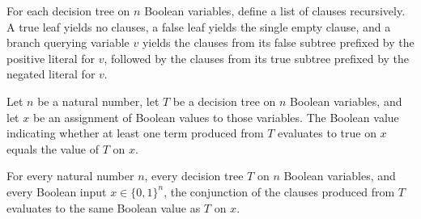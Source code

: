 \begin{definition}
\label{SwitchingLemma.toClauses}
\leanok
{}
For each decision tree on $n$ Boolean variables, define a list of clauses recursively. A
true leaf yields no clauses, a false leaf yields the single empty clause, and a branch
querying variable $v$ yields the clauses from its false subtree prefixed by the positive
literal for $v$, followed by the clauses from its true subtree prefixed by the negated
literal for $v$.
\end{definition}

\begin{lemma}
\label{SwitchingLemma.toTerms_eval}
\leanok
{}
Let $n$ be a natural number, let $T$ be a decision tree on $n$ Boolean variables, and
let $x$ be an assignment of Boolean values to those variables. The Boolean value
indicating whether at least one term produced from $T$ evaluates to true on $x$ equals
the value of $T$ on $x$.
\end{lemma}

\begin{lemma}
\label{SwitchingLemma.toClauses_eval}
\leanok
{}
For every natural number $n$, every decision tree $T$ on $n$ Boolean variables, and
every Boolean input $x\in\{0,1\}^n$, the conjunction of the clauses produced from $T$
evaluates to the same Boolean value as $T$ on $x$.
\end{lemma}
